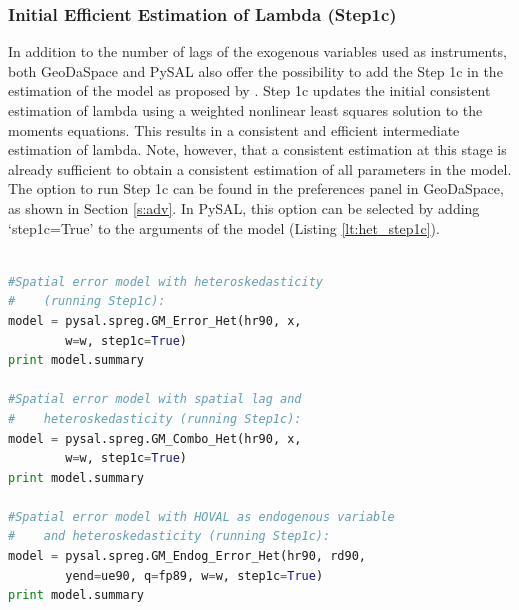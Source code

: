 \documentclass{article}
\begin{document}
\subsubsection{Initial Efficient Estimation of Lambda (Step1c)}
\label{s:step1c}
In addition to the number of lags of the exogenous variables used as instruments, both GeoDaSpace and PySAL also offer the possibility to add the Step 1c in the estimation of the model as proposed by \citet{Arraiz10}. Step 1c updates the initial consistent estimation of lambda using a weighted nonlinear least squares solution to the moments equations. This results in a consistent and efficient intermediate estimation of lambda. Note, however, that a consistent estimation at this stage is already sufficient to obtain a consistent estimation of all parameters in the model. The option to run Step 1c can be found in the preferences panel in GeoDaSpace, as shown in Section \ref{s:adv}. In PySAL, this option can be selected by adding `step1c=True' to the arguments of the model (Listing \ref{lt:het_step1c}).

\begin{code}
\begin{lstlisting}[label=lt:het_step1c,caption=Using PySAL to match the results of spatial error models with heteroskedasticity and endogenous variables or spatial lag from Stata,language=Python]

#Spatial error model with heteroskedasticity
#    (running Step1c):
model = pysal.spreg.GM_Error_Het(hr90, x,
        w=w, step1c=True)
print model.summary

#Spatial error model with spatial lag and
#    heteroskedasticity (running Step1c):
model = pysal.spreg.GM_Combo_Het(hr90, x,
        w=w, step1c=True)
print model.summary

#Spatial error model with HOVAL as endogenous variable
#    and heteroskedasticity (running Step1c):
model = pysal.spreg.GM_Endog_Error_Het(hr90, rd90,
        yend=ue90, q=fp89, w=w, step1c=True)
print model.summary

\end{lstlisting}
\end{code}


\newpage


\end{document}
